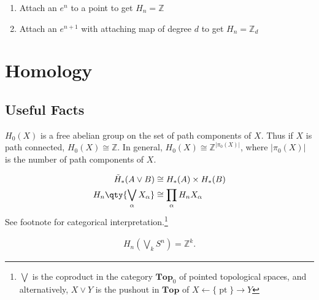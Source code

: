 \begin{enumerate}
\def\labelenumi{\arabic{enumi}.}
\item
  Attach an \(e^n\) to a point to get \(H_{n} = {\mathbb{Z}}\)
\item
  Attach an \(e^{n+1}\) with attaching map of degree \(d\) to get
  \(H_{n} = {\mathbb{Z}}_{d}\)
\end{enumerate}

\hypertarget{homology}{%
\section{Homology}\label{homology}}

\hypertarget{useful-facts-1}{%
\subsection{Useful Facts}\label{useful-facts-1}}

\begin{fact}

\(H_0(X)\) is a free abelian group on the set of path components of
\(X\). Thus if \(X\) is path connected, \(H_0(X) \cong {\mathbb{Z}}\).
In general,
\(H_0(X) \cong {\mathbb{Z}}^{{\left\lvert {\pi_0(X)} \right\rvert}}\),
where \({\left\lvert {\pi_0(X)} \right\rvert}\) is the number of path
components of \(X\).

\end{fact}

\begin{proposition}

\begin{align*}
\tilde H_*(A\vee B) &\cong H_*(A) \times H_*(B) \\
H_{n}\qty{\bigvee_\alpha X_\alpha} &\cong \prod_\alpha H_{n} X_\alpha
\end{align*}
See footnote for categorical interpretation.\footnote{\(\bigvee\) is the
  coproduct in the category \(\mathbf{Top}_0\) of pointed topological
  spaces, and alternatively, \(X\vee Y\) is the pushout in
  \(\mathbf{Top}\) of \(X \leftarrow{\{\operatorname{pt}\}}\to Y\)}

\end{proposition}


\begin{example}[Application]

\begin{align*}
H_{n}(\bigvee_{k} S^n) = {\mathbb{Z}}^k
.\end{align*}

\end{example}

